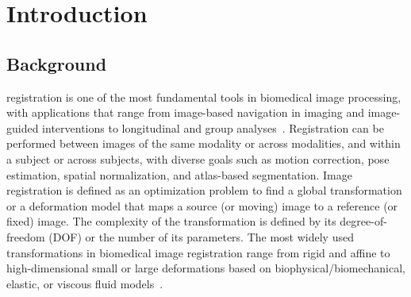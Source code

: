 \documentclass[journal,transmag]{IEEEtran}
\begin{document}
\IEEEdisplaynontitleabstractindextext

\IEEEpeerreviewmaketitle


\section{Introduction}

\subsection{Background}

 registration is one of the most fundamental tools in biomedical image processing, with applications that range from image-based navigation in imaging and image-guided interventions to longitudinal and group analyses~\cite{hill2001medical,pluim2003mutual,gholipour2007brain,shams2010survey,markelj2012review,sotiras2013deformable,ferrante2017slice}. %
Registration can be performed between images of the same modality or across modalities, and within a subject or across subjects, with diverse goals such as motion correction, pose estimation, spatial normalization, and atlas-based segmentation. %
Image registration is defined as an optimization problem to find a global transformation or a deformation model that maps a source (or moving) image to a reference (or fixed) image. The complexity of the transformation is defined by its degree-of-freedom (DOF) or the number of its parameters. The most widely used transformations in biomedical image registration range from rigid and affine to high-dimensional small or large deformations based on biophysical/biomechanical, elastic, or viscous fluid models~\cite{sotiras2013deformable}.
\end{document}
